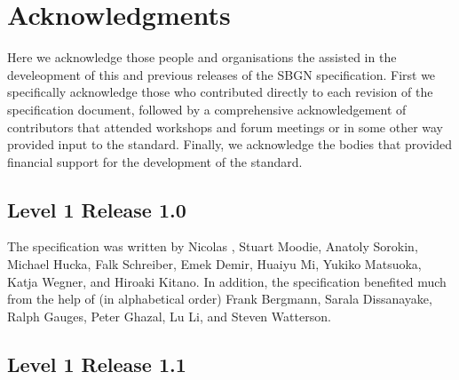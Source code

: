 \chapter{Acknowledgments}\label{sec:acknowledgments}

Here we acknowledge those people and organisations the assisted in the develeopment of this and previous releases of the SBGN \PDl specification. First we specifically acknowledge those who contributed directly to each revision of the  specification document, followed by a comprehensive acknowledgement of contributors that attended workshops and forum meetings or in some other way provided input to the standard. Finally, we acknowledge the bodies that provided financial support for the development of the standard.



\section{Level 1 Release 1.0}

The specification was written by Nicolas \lenov{}, 
Stuart Moodie, Anatoly Sorokin, Michael Hucka, Falk Schreiber, Emek Demir, 
Huaiyu Mi, Yukiko Matsuoka, Katja Wegner, and Hiroaki Kitano. In addition, 
the specification benefited much from the help of (in alphabetical order) Frank Bergmann, Sarala 
Dissanayake, Ralph Gauges, Peter Ghazal, Lu Li, and Steven Watterson.


\section{Level 1 Release 1.1}

